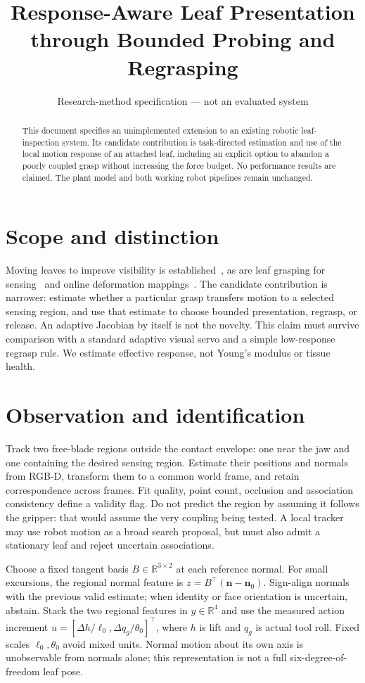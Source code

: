 \documentclass[letterpaper,10pt,conference]{ieeeconf}
\title{Response-Aware Leaf Presentation through Bounded Probing and Regrasping}
\author{Research-method specification --- not an evaluated system}
\begin{document}
\maketitle
\begin{abstract}
This document specifies an unimplemented extension to an existing robotic leaf-inspection
system. Its candidate contribution is task-directed estimation and use of the local
motion response of an attached leaf, including an explicit option to abandon a poorly
coupled grasp without increasing the force budget. No performance results are claimed.
The plant model and both working robot pipelines remain unchanged.
\end{abstract}

\section{Scope and distinction}
Moving leaves to improve visibility is established~\cite{yao2025}, as are leaf grasping
for sensing~\cite{mortazavi2026} and online deformation mappings~\cite{hu2017}. The
candidate contribution is narrower: estimate whether a particular grasp transfers motion
to a selected sensing region, and use that estimate to choose bounded presentation,
regrasp, or release. An adaptive Jacobian by itself is not the novelty. This claim must
survive comparison with a standard adaptive visual servo and a simple low-response
regrasp rule. We estimate effective response, not Young's modulus or tissue health.

\section{Observation and identification}
Track two free-blade regions outside the contact envelope: one near the jaw and one
containing the desired sensing region. Estimate their positions and normals from RGB-D,
transform them to a common world frame, and retain correspondence across frames. Fit
quality, point count, occlusion and association consistency define a validity flag. Do
not predict the region by assuming it follows the gripper: that would assume the very
coupling being tested. A local tracker may use robot motion as a broad search proposal,
but must also admit a stationary leaf and reject uncertain associations.

Choose a fixed tangent basis $B\in\mathbb R^{3\times2}$ at each reference normal. For
small excursions, the regional normal feature is $z=B^\top(\mathbf n-\mathbf n_0)$.
Sign-align normals with the previous valid estimate; when identity or face orientation
is uncertain, abstain. Stack the two regional features in $y\in\mathbb R^4$ and use
the measured action increment $u=[\Delta h/\ell_0,\Delta q_g/\theta_0]^\top$, where
$h$ is lift and $q_g$ is actual tool roll. Fixed scales $\ell_0,\theta_0$ avoid mixed
units. Normal motion about its own axis is unobservable from normals alone; this
representation is not a full six-degree-of-freedom leaf pose.
\end{document}

